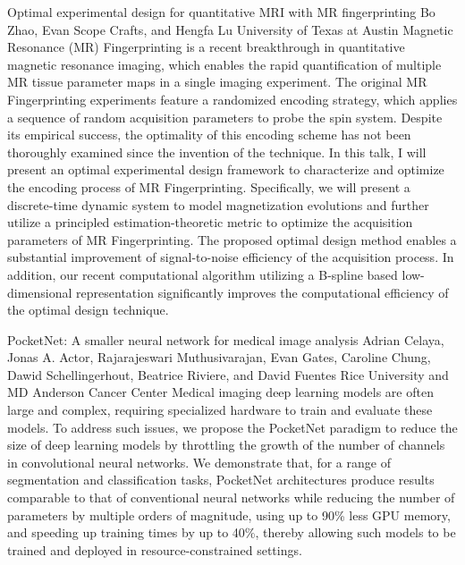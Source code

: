 \vspace{1.5ex}
\abs
{Optimal experimental design for quantitative MRI with MR fingerprinting}
{Bo Zhao, Evan Scope Crafts, and Hengfa Lu}
{University of Texas at Austin}
{Magnetic Resonance (MR) Fingerprinting is a recent breakthrough in quantitative magnetic resonance imaging, which enables the rapid quantification of multiple MR tissue parameter maps in a single imaging experiment. The original MR Fingerprinting experiments feature a randomized encoding strategy, which applies a sequence of random acquisition parameters to probe the spin system. Despite its empirical success, the optimality of this encoding scheme has not been thoroughly examined since the invention of the technique. In this talk, I will present an optimal experimental design framework to characterize and optimize the encoding process of MR Fingerprinting. Specifically, we will present a discrete-time dynamic system to model magnetization evolutions and further utilize a principled estimation-theoretic metric to optimize the acquisition parameters of MR Fingerprinting. The proposed optimal design method enables a substantial improvement of signal-to-noise efficiency of the acquisition process. In addition, our recent computational algorithm utilizing a B-spline based low-dimensional representation significantly improves the computational efficiency of the optimal design technique.}


\vspace{1.5ex}
\abs
{PocketNet: A smaller neural network for medical image analysis}
{Adrian Celaya, Jonas A. Actor, Rajarajeswari Muthusivarajan, Evan
Gates, Caroline Chung, Dawid Schellingerhout, Beatrice Riviere, and
David Fuentes}
{Rice University and MD Anderson Cancer Center}
{Medical imaging deep learning models are often large and complex,
requiring specialized hardware to train and evaluate these models. To
address such issues, we propose the PocketNet paradigm to reduce the
size of deep learning models by throttling the growth of the number of
channels in convolutional neural networks. We demonstrate that, for a
range of segmentation and classification tasks, PocketNet
architectures produce results comparable to that of conventional
neural networks while reducing the number of parameters by multiple
orders of magnitude, using up to 90\% less GPU memory, and speeding up
training times by up to 40\%, thereby allowing such models to be
trained and deployed in resource-constrained settings.}



